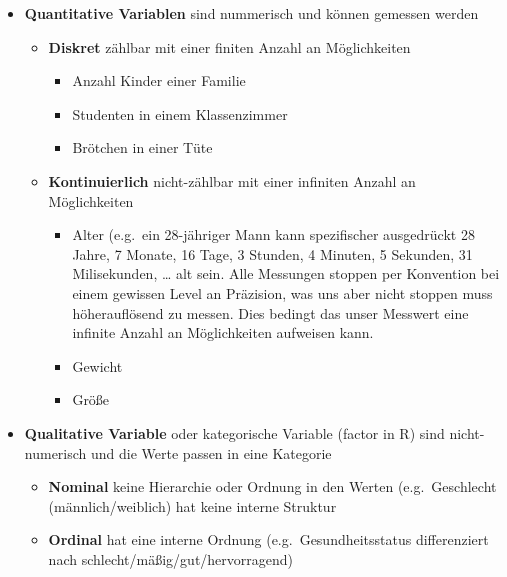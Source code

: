 \documentclass[
]{article}
\providecommand{\tightlist}{%
  \setlength{\itemsep}{0pt}\setlength{\parskip}{0pt}}
\begin{document}
\begin{itemize}
\tightlist
\item
  \textbf{Quantitative Variablen} sind nummerisch und können gemessen werden

  \begin{itemize}
  \tightlist
  \item
    \textbf{Diskret} zählbar mit einer finiten Anzahl an Möglichkeiten

    \begin{itemize}
    \tightlist
    \item
      Anzahl Kinder einer Familie
    \item
      Studenten in einem Klassenzimmer
    \item
      Brötchen in einer Tüte
    \end{itemize}
  \item
    \textbf{Kontinuierlich} nicht-zählbar mit einer infiniten Anzahl an Möglichkeiten

    \begin{itemize}
    \tightlist
    \item
      Alter (e.g.~ein 28-jähriger Mann kann spezifischer ausgedrückt 28 Jahre, 7 Monate, 16 Tage, 3 Stunden, 4 Minuten, 5 Sekunden, 31 Milisekunden, \ldots{} alt sein. Alle Messungen stoppen per Konvention bei einem gewissen Level an Präzision, was uns aber nicht stoppen muss höherauflösend zu messen. Dies bedingt das unser Messwert eine infinite Anzahl an Möglichkeiten aufweisen kann.
    \item
      Gewicht
    \item
      Größe
    \end{itemize}
  \end{itemize}
\item
  \textbf{Qualitative Variable} oder kategorische Variable (factor in R) sind nicht-numerisch und die Werte passen in eine Kategorie

  \begin{itemize}
  \tightlist
  \item
    \textbf{Nominal} keine Hierarchie oder Ordnung in den Werten (e.g.~Geschlecht (männlich/weiblich) hat keine interne Struktur
  \item
    \textbf{Ordinal} hat eine interne Ordnung (e.g.~Gesundheitsstatus differenziert nach schlecht/mäßig/gut/hervorragend)
  \end{itemize}
\end{itemize}
\end{document}
